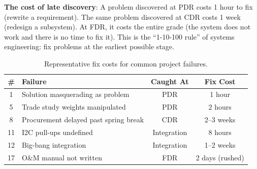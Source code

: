 \textbf{The cost of late discovery}: A problem discovered at PDR costs 1 hour to fix (rewrite a requirement). The same problem discovered at CDR costs 1 week (redesign a subsystem). At FDR, it costs the entire grade (the system does not work and there is no time to fix it). This is the ``1-10-100 rule'' of systems engineering: fix problems at the earliest possible stage.

\begin{table}[htbp]\centering\small
\begin{tabularx}{\textwidth}{c X c c}
\toprule
\textbf{\#} & \textbf{Failure} & \textbf{Caught At} & \textbf{Fix Cost} \\
\midrule
1 & Solution masquerading as problem & PDR & 1 hour \\
5 & Trade study weights manipulated & PDR & 2 hours \\
8 & Procurement delayed past spring break & CDR & 2--3 weeks \\
11 & I2C pull-ups undefined & Integration & 8 hours \\
12 & Big-bang integration & Integration & 1--2 weeks \\
17 & O\&M manual not written & FDR & 2 days (rushed) \\
\bottomrule
\end{tabularx}
\caption{Representative fix costs for common project failures.}
\end{table}




